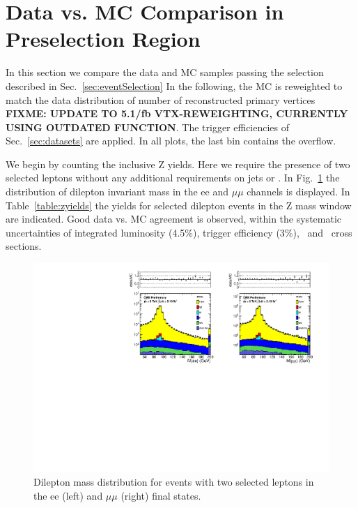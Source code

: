 \clearpage

\section{Data vs. MC Comparison in Preselection Region}
\label{sec:yields}

In this section we compare the data and MC samples passing the selection described in Sec.~\ref{sec:eventSelection}
In the following, the MC is reweighted to match the data distribution of number of reconstructed primary vertices
{\bf FIXME: UPDATE TO 5.1/fb VTX-REWEIGHTING, CURRENTLY USING OUTDATED FUNCTION}. 
The trigger efficiencies of Sec.~\ref{sec:datasets} are applied. In all plots, the last bin contains the overflow.

We begin by counting the inclusive Z yields. Here we require the presence of two selected leptons without
any additional requirements on jets or \MET. In Fig.~\ref{fig:dilmass} the distribution of dilepton invariant
mass in the ee and $\mu\mu$ channels is displayed. In Table~\ref{table:zyields} the yields for selected dilepton
events in the Z mass window are indicated. Good data vs. MC agreement is observed, within the systematic uncertainties
of integrated luminosity (4.5\%), trigger efficiency (3\%), \zjets\ and \ttbar\ cross sections.

\begin{figure}[hbt]
  \begin{center}
	\includegraphics[width=1.0\linewidth]{plots/dilmass_ee_mm.pdf}
	\caption{
	  \label{fig:dilmass}\protect 
	  Dilepton mass distribution for events with two selected leptons
	  in the ee (left) and $\mu\mu$ (right) final states.}
  \end{center}
\end{figure}


